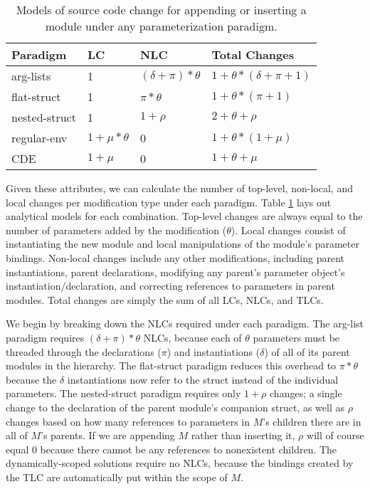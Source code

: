 \begin{table}
\centering
\begin{tabular}{llll}
\toprule
Paradigm    & LC & NLC & Total Changes\\
\midrule
arg-lists      &  1              & $(\delta+\pi)*\theta$ & $1+\theta*(\delta+\pi+1)$  \\
flat-struct    &  1              & $\pi*\theta$          & $1+\theta*(\pi+1)$  \\
nested-struct  &  1              & $1+\rho$              & $2+\theta+\rho$  \\
regular-env    &  $1+\mu*\theta$ & 0                     & $1+\theta*(1+\mu)$ \\
CDE            &  $1+\mu$        & 0                     & $1+\theta+\mu$  \\
\bottomrule
\end{tabular}
\caption[Models of source code change.]{
Models of source code change for appending or inserting a module under any parameterization paradigm.}
\label{tab:limit}
\end{table}

Given these attributes, we can calculate the number of top-level, non-local, and local changes per modification type under each paradigm.
Table \ref{tab:limit} lays out analytical models for each combination.
Top-level changes are always equal to the number of parameters added by the modification ($\theta$).
Local changes consist of instantiating the new module and local manipulations of the module's parameter bindings.
Non-local changes include any other modifications, including parent instantiations, parent declarations, modifying any parent's parameter object's instantiation/declaration,
and correcting references to parameters in parent modules.
Total changes are simply the sum of all LCs, NLCs, and TLCs.

We begin by breaking down the NLCs required under each paradigm.
The arg-list paradigm requires $(\delta+\pi)*\theta$ NLCs, because each of $\theta$ parameters must be threaded through the declarations ($\pi$) and instantiations ($\delta$) of all of its parent modules in the hierarchy.
The flat-struct paradigm reduces this overhead to $\pi*\theta$ because the $\delta$ instantiations now refer to the struct instead of the individual parameters.
The nested-struct paradigm requires only $1+\rho$ changes; a single change to the declaration of the parent module's companion struct, as well as $\rho$ changes based on how many
references to parameters in $M$'s children there are in all of $M$'s parents.
If we are appending $M$ rather than inserting it, $\rho$ will of course equal 0 because there cannot be any references to nonexistent children.
The dynamically-scoped solutions require no NLCs, because the bindings created by the TLC are automatically put within the scope of $M$.

